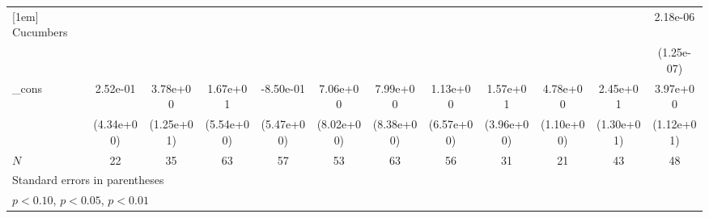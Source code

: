 \begin{table}[htbp]
\begin{tabular}{l*{11}{c}}
[1em]
Cucumbers   &                     &                     &                     &                     &                     &                     &                     &                     &                     &                     &    2.18e-06\sym{***}\\
            &                     &                     &                     &                     &                     &                     &                     &                     &                     &                     &  (1.25e-07)         \\
[1em]
\_cons      &    2.52e-01         &    3.78e+00         &    1.67e+01\sym{**} &   -8.50e-01         &    7.06e+00         &    7.99e+00         &    1.13e+00         &    1.57e+01\sym{***}&    4.78e+00\sym{**} &    2.45e+01         &    3.97e+00         \\
            &  (4.34e+00)         &  (1.25e+01)         &  (5.54e+00)         &  (5.47e+00)         &  (8.02e+00)         &  (8.38e+00)         &  (6.57e+00)         &  (3.96e+00)         &  (1.10e+00)         &  (1.30e+01)         &  (1.12e+01)         \\
\hline
\(N\)       &          22         &          35         &          63         &          57         &          53         &          63         &          56         &          31         &          21         &          43         &          48         \\
\hline\hline
\multicolumn{12}{l}{\footnotesize Standard errors in parentheses}\\
\multicolumn{12}{l}{\footnotesize \sym{*} \(p<0.10\), \sym{**} \(p<0.05\), \sym{***} \(p<0.01\)}\\
\end{tabular}
\end{table}
